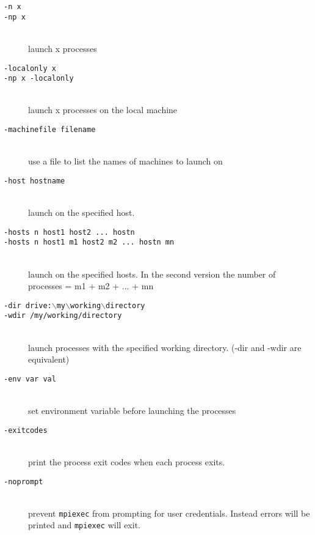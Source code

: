 \documentclass[dvipdfm,11pt]{article}
\begin{document}
\begin{description}
\item[\texttt{-n x}]
\item[\texttt{-np x}]\mbox{}\\
  launch x processes
\item[\texttt{-localonly x}]
\item[\texttt{-np x -localonly}]\mbox{}\\
  launch x processes on the local machine
\item[\texttt{-machinefile filename}]\mbox{}\\
  use a file to list the names of machines to launch on
\item[\texttt{-host hostname}]\mbox{}\\
  launch on the specified host.
\item[\texttt{-hosts n host1 host2 ... hostn}]
\item[\texttt{-hosts n host1 m1 host2 m2 ... hostn mn}]\mbox{}\\
  launch on the specified hosts.
  In the second version the number of processes = m1 + m2 + ... + mn
\item[\texttt{-dir drive:$\backslash$my$\backslash$working$\backslash$directory}]
\item[\texttt{-wdir /my/working/directory}]\mbox{}\\
  launch processes with the specified working directory. (-dir and -wdir are
equivalent)
\item[\texttt{-env var val}]\mbox{}\\
  set environment variable before launching the processes
\item[\texttt{-exitcodes}]\mbox{}\\
  print the process exit codes when each process exits.
\item[\texttt{-noprompt}]\mbox{}\\
  prevent \texttt{mpiexec} from prompting for user credentials.  Instead errors will
be printed and \texttt{mpiexec} will exit.

\end{description}
\end{document}
